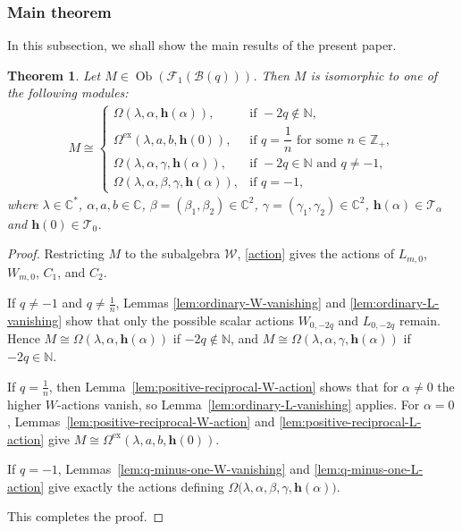 \documentclass[a4paper]{amsart}
\numberwithin{equation}{section}
\newtheorem{theorem}{Theorem}[section]
\begin{document}
\subsubsection{Main theorem}
In this subsection, we shall show the main results of the present  paper.
 \begin{theorem}\label{thm3.4}
Let $M\in\operatorname{Ob}(\mathcal F_1(\mathcal B(q)))$. Then $M$ is isomorphic to one of the following
modules:
\begin{align*}
M\cong
\begin{cases}
\Omega(\lambda,\alpha,\mathbf h(\alpha)),
& \text{if } -2q\notin\mathbb N,\\
\Omega^{\mathrm{ex}}(\lambda,a,b,\mathbf h(0)),
& \text{if } q=\dfrac1n \text{ for some } n\in\mathbb Z_{+},\\
\Omega(\lambda,\alpha,\gamma,\mathbf h(\alpha)),
& \text{if } -2q\in\mathbb N \text{ and } q\neq -1,\\
\Omega(\lambda,\alpha,\beta,\gamma,\mathbf h(\alpha)),
& \text{if } q=-1,
\end{cases}
\end{align*}
where $\lambda\in\mathbb C^*$, $\alpha,a,b\in\mathbb C$,
$\beta=(\beta_1,\beta_2)\in\mathbb C^2$,
$\gamma=(\gamma_1,\gamma_2)\in\mathbb C^2$, $\mathbf h(\alpha)\in\mathcal T_\alpha$ and $\mathbf h(0)\in\mathcal T_0$.
\end{theorem}
\begin{proof}
Restricting $M$ to the subalgebra $\mathcal W$, \eqref{action}
gives the actions of $L_{m,0}$, $W_{m,0}$, $C_1$, and $C_2$.

If $q\neq -1$ and $q\neq \frac1n$, Lemmas
\ref{lem:ordinary-W-vanishing} and \ref{lem:ordinary-L-vanishing}
show that only the possible scalar actions $W_{0,-2q}$ and
$L_{0,-2q}$ remain. Hence $M\cong \Omega(\lambda,\alpha,\mathbf h(\alpha))$
if $-2q\notin\mathbb N$, and
$M\cong\Omega(\lambda,\alpha,\gamma,\mathbf h(\alpha))$ if $-2q\in\mathbb N$.

If $q=\frac1n$, then Lemma~\ref{lem:positive-reciprocal-W-action}
shows that for $\alpha\neq0$ the higher $W$-actions vanish, so
Lemma~\ref{lem:ordinary-L-vanishing} applies. For $\alpha=0$,
Lemmas~\ref{lem:positive-reciprocal-W-action} and
\ref{lem:positive-reciprocal-L-action} give
$M\cong\Omega^{\mathrm{ex}}(\lambda,a,b,\mathbf h(0))$.

If $q=-1$, Lemmas~\ref{lem:q-minus-one-W-vanishing} and
\ref{lem:q-minus-one-L-action} give exactly the actions defining
$\Omega\big(\lambda,\alpha,\beta,\gamma,\mathbf h(\alpha)\big)$.

This completes the proof.
\end{proof}
\end{document}
